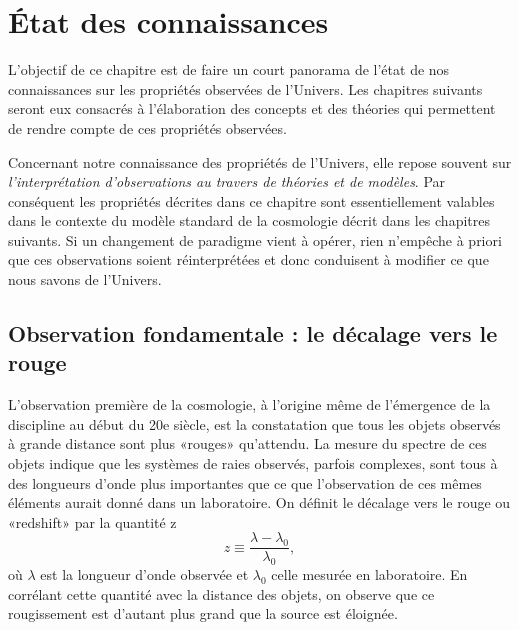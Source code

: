 \chapter{État des connaissances}


L'objectif de ce chapitre est de faire un court panorama de l'état de nos connaissances sur les propriétés observées de l'Univers. Les chapitres suivants seront eux consacrés à l'élaboration des concepts et des théories qui permettent de rendre compte de ces propriétés observées. 

Concernant notre connaissance des propriétés de l'Univers, elle repose souvent sur \textit{l'interprétation d'observations au travers de théories et de modèles}. Par conséquent les propriétés décrites dans ce chapitre sont essentiellement valables dans le contexte du modèle standard de la cosmologie décrit dans les chapitres suivants. Si un changement de paradigme vient à opérer, rien n'empêche à priori que ces observations soient réinterprétées et donc conduisent à modifier ce que nous savons de l'Univers.

\section{Observation fondamentale : le décalage vers le rouge}
L'observation première de la cosmologie, à l'origine même de l'émergence de la discipline au début du 20e siècle, est la constatation que tous les objets observés à grande distance sont plus «rouges» qu'attendu. La mesure du spectre de ces objets indique que les systèmes de raies observés, parfois complexes, sont tous à des longueurs d'onde plus importantes que ce que l'observation de ces mêmes éléments aurait donné dans un laboratoire. On définit le décalage vers le rouge ou «redshift» par la quantité z
\begin{equation}
z\equiv\frac{\lambda-\lambda_0}{\lambda_0},
\end{equation}
où $\lambda$ est la longueur d'onde observée et $\lambda_0$ celle mesurée en laboratoire. En corrélant cette quantité avec la distance des objets, on observe que ce rougissement est d'autant plus grand que la source est éloignée. 

